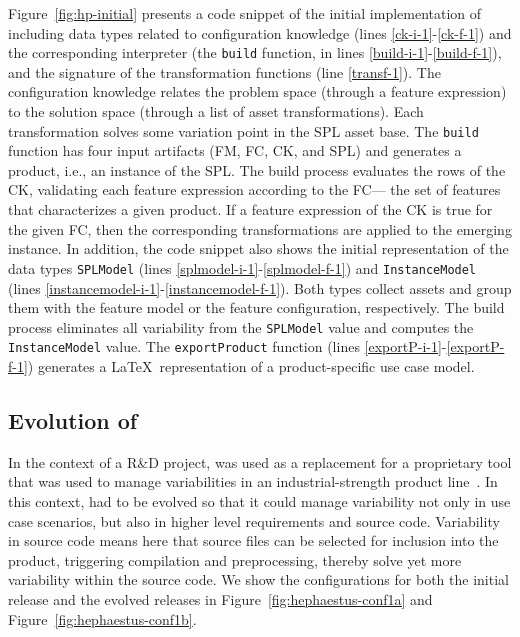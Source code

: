 Figure~\ref{fig:hp-initial} presents a code snippet of
the initial implementation of \hp{} including data types related to
configuration knowledge (lines \ref{ck-i-1}-\ref{ck-f-1}) and the
corresponding interpreter (the \texttt{build} function, in lines
\ref{build-i-1}-\ref{build-f-1}), and the signature of the
transformation functions (line \ref{transf-1}). The configuration
knowledge relates the problem space (through a feature expression) to
the solution space (through a list of asset transformations). Each
transformation solves some variation point in the SPL asset base. The
\texttt{build} function has four input artifacts (FM, FC, CK, and SPL)
and generates a product, i.e., an instance of the SPL. The build
process evaluates the rows of the CK, validating each feature
expression according to the FC--- the set of features that
characterizes a given product. If a feature expression of the CK is
true for the given FC, then the corresponding transformations are
applied to the emerging instance. In addition, the code snippet also
shows the initial representation of the data types \texttt{SPLModel}
(lines \ref{splmodel-i-1}-\ref{splmodel-f-1}) and
\texttt{InstanceModel} (lines
\ref{instancemodel-i-1}-\ref{instancemodel-f-1}). Both types collect
assets and group them with the feature model or the feature
configuration, respectively. The build process eliminates all
variability from the \texttt{SPLModel} value and computes the
\texttt{InstanceModel} value. The \texttt{exportProduct} function
(lines \ref{exportP-i-1}-\ref{exportP-f-1}) generates a \LaTeX\
representation of a product-specific use case model.


\subsection{Evolution of \hp} 
\label{sec:hp-evolution}

In the context of a R\&D project, \hp{} was used as a replacement for
a proprietary tool that was used to manage variabilities in an
industrial-strength product line~\cite{ferreira:2010}. In this
context, \hp{} had to be evolved so that it could manage variability
not only in use case scenarios, but also in higher level requirements
and source code. Variability in source code means here that source
files can be selected for inclusion into the product, triggering
compilation and preprocessing, thereby solve yet more variability
within the source code. We show the configurations for both the
initial release and the evolved releases in
Figure~\ref{fig:hephaestus-conf1a} and
Figure~\ref{fig:hephaestus-conf1b}.

